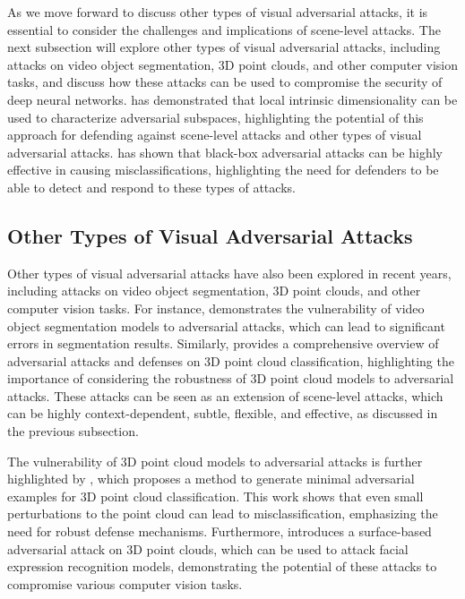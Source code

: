 \documentclass[11pt]{article}
\begin{document}
As we move forward to discuss other types of visual adversarial attacks, it is essential to consider the challenges and implications of scene-level attacks. The next subsection will explore other types of visual adversarial attacks, including attacks on video object segmentation, 3D point clouds, and other computer vision tasks, and discuss how these attacks can be used to compromise the security of deep neural networks. \cite{ref84} has demonstrated that local intrinsic dimensionality can be used to characterize adversarial subspaces, highlighting the potential of this approach for defending against scene-level attacks and other types of visual adversarial attacks. \cite{ref85} has shown that black-box adversarial attacks can be highly effective in causing misclassifications, highlighting the need for defenders to be able to detect and respond to these types of attacks.

\subsection{Other Types of Visual Adversarial Attacks}

Other types of visual adversarial attacks have also been explored in recent years, including attacks on video object segmentation, 3D point clouds, and other computer vision tasks. For instance, \cite{ref12} demonstrates the vulnerability of video object segmentation models to adversarial attacks, which can lead to significant errors in segmentation results. Similarly, \cite{ref86} provides a comprehensive overview of adversarial attacks and defenses on 3D point cloud classification, highlighting the importance of considering the robustness of 3D point cloud models to adversarial attacks. These attacks can be seen as an extension of scene-level attacks, which can be highly context-dependent, subtle, flexible, and effective, as discussed in the previous subsection.

The vulnerability of 3D point cloud models to adversarial attacks is further highlighted by \cite{ref87}, which proposes a method to generate minimal adversarial examples for 3D point cloud classification. This work shows that even small perturbations to the point cloud can lead to misclassification, emphasizing the need for robust defense mechanisms. Furthermore, \cite{ref88} introduces a surface-based adversarial attack on 3D point clouds, which can be used to attack facial expression recognition models, demonstrating the potential of these attacks to compromise various computer vision tasks.
\end{document}
